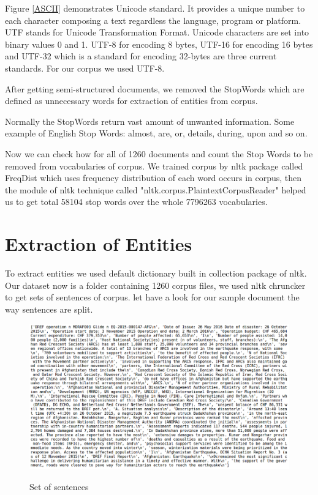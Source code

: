 Figure \ref{ASCII} demonstrates Unicode  standard. It provides  a unique number to each character composing a text regardless the language, program  or platform.
UTF stands for Unicode Transformation Format. Unicode characters are set into binary values 0 and 1. UTF-8 for encoding  8 bytes, UTF-16 for encoding 16 bytes and UTF-32 which is a standard for encoding 32-bytes are three current standards.
For our corpus we used UTF-8.

After getting semi-structured documents, we removed the StopWords which are defined as unnecessary words for extraction of entities from corpus.

Normally the StopWords return vast amount of unwanted information. Some example of English Stop Words: almost, are, or,  details, during, upon and so on.

Now we can check how for all of 1260 documents and count the Stop Words to be removed from vocabularies of corpus. We trained corpus by nltk package called FreqDist which uses  frequency distribution of each word occurs in corpus, then the module of nltk technique called "nltk.corpus.PlaintextCorpusReader" helped us to get total 58104 stop words over the whole  7796263  vocabularies.

\section{Extraction of Entities }

To extract entities we used default dictionary built in collection package of nltk. Our dataset now is a folder containing 1260 corpus files, we  used nltk chruncker to get sets of sentences of corpus. let have a look for our sample document the way sentences are split. 
\begin{figure}[hbtp]
\caption{Set of sentences}
\centering
\includegraphics[scale=0.4]{images/corpus.png}\label{Set of sentences}
\end{figure}


